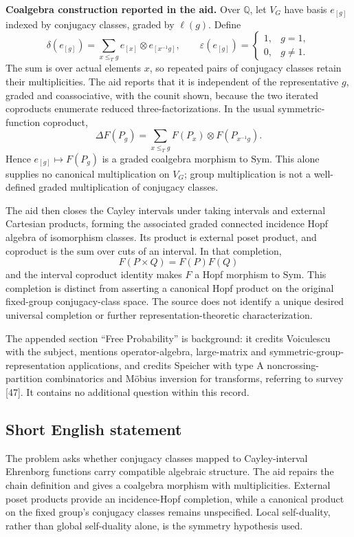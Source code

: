 \documentclass[11pt]{article}
\newcommand{\Q}{\mathbb{Q}}
\begin{document}
\textbf{Coalgebra construction reported in the aid.} Over \(\Q\), let \(V_G\) have basis \(e_{[g]}\) indexed by conjugacy classes, graded by \(\ell(g)\). Define
\[
 \delta(e_{[g]})=\sum_{x\le_Tg}
              e_{[x]}\otimes e_{[x^{-1}g]},\qquad
 \varepsilon(e_{[g]})=\begin{cases}1,&g=1,\\0,&g\ne1.\end{cases}
\]
The sum is over actual elements \(x\), so repeated pairs of conjugacy classes retain their multiplicities. The aid reports that it is independent of the representative \(g\), graded and coassociative, with the counit shown, because the two iterated coproducts enumerate reduced three-factorizations. In the usual symmetric-function coproduct,
\[
 \Delta F(P_g)=\sum_{x\le_Tg}F(P_x)\otimes F(P_{x^{-1}g}).
\]
Hence \(e_{[g]}\mapsto F(P_g)\) is a graded coalgebra morphism to \(\mathrm{Sym}\). This alone supplies no canonical multiplication on \(V_G\); group multiplication is not a well-defined graded multiplication of conjugacy classes.

The aid then closes the Cayley intervals under taking intervals and external Cartesian products, forming the associated graded connected incidence Hopf algebra of isomorphism classes. Its product is external poset product, and coproduct is the sum over cuts of an interval. In that completion,
\[
 F(P\times Q)=F(P)F(Q)
\]
and the interval coproduct identity makes \(F\) a Hopf morphism to \(\mathrm{Sym}\). This completion is distinct from asserting a canonical Hopf product on the original fixed-group conjugacy-class space. The source does not identify a unique desired universal completion or further representation-theoretic characterization.

The appended section ``Free Probability'' is background: it credits Voiculescu with the subject, mentions operator-algebra, large-matrix and symmetric-group-representation applications, and credits Speicher with type A noncrossing-partition combinatorics and M\"obius inversion for transforms, referring to survey [47]. It contains no additional question within this record.
\subsection{Short English statement}
The problem asks whether conjugacy classes mapped to Cayley-interval Ehrenborg functions carry compatible algebraic structure. The aid repairs the chain definition and gives a coalgebra morphism with multiplicities. External poset products provide an incidence-Hopf completion, while a canonical product on the fixed group's conjugacy classes remains unspecified. Local self-duality, rather than global self-duality alone, is the symmetry hypothesis used.
\end{document}
